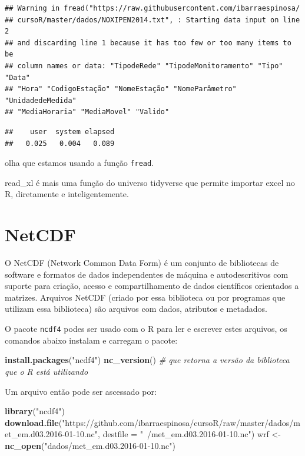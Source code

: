 \documentclass[]{book}
\newenvironment{Shaded}{\begin{snugshade}}{\end{snugshade}}
\newcommand{\KeywordTok}[1]{\textcolor[rgb]{0.13,0.29,0.53}{\textbf{#1}}}
\newcommand{\DataTypeTok}[1]{\textcolor[rgb]{0.13,0.29,0.53}{#1}}
\newcommand{\StringTok}[1]{\textcolor[rgb]{0.31,0.60,0.02}{#1}}
\newcommand{\CommentTok}[1]{\textcolor[rgb]{0.56,0.35,0.01}{\textit{#1}}}
\newcommand{\NormalTok}[1]{#1}
\theoremstyle{definition}
\theoremstyle{definition}
\theoremstyle{definition}
\theoremstyle{remark}
\begin{document}
\begin{verbatim}
## Warning in fread("https://raw.githubusercontent.com/ibarraespinosa/
## cursoR/master/dados/NOXIPEN2014.txt", : Starting data input on line 2
## and discarding line 1 because it has too few or too many items to be
## column names or data: "TipodeRede" "TipodeMonitoramento" "Tipo" "Data"
## "Hora" "CodigoEstação" "NomeEstação" "NomeParâmetro" "UnidadedeMedida"
## "MediaHoraria" "MediaMovel" "Valido"
\end{verbatim}

\begin{verbatim}
##    user  system elapsed 
##   0.025   0.004   0.089
\end{verbatim}

olha que estamos usando a função \texttt{fread}.

read\_xl é mais uma função do universo tidyverse que permite importar
excel no R, diretamente e inteligentemente.

\section{NetCDF}\label{netcdf}

O NetCDF (Network Common Data Form) é um conjunto de bibliotecas de
software e formatos de dados independentes de máquina e autodescritivos
com suporte para criação, acesso e compartilhamento de dados científicos
orientados a matrizes. Arquivos NetCDF (criado por essa biblioteca ou
por programas que utilizam essa biblioteca) são arquivos com dados,
atributos e metadados.

O pacote \texttt{ncdf4} podes ser usado com o R para ler e escrever
estes arquivos, os comandos abaixo instalam e carregam o pacote:

\begin{Shaded}
\begin{Highlighting}[]
\KeywordTok{install.packages}\NormalTok{(}\StringTok{"ncdf4"}\NormalTok{)}
\KeywordTok{nc_version}\NormalTok{() }\CommentTok{# que retorna a versão da biblioteca que o R está utilizando}
\end{Highlighting}
\end{Shaded}

Um arquivo então pode ser ascessado por:

\begin{Shaded}
\begin{Highlighting}[]
\KeywordTok{library}\NormalTok{(}\StringTok{"ncdf4"}\NormalTok{)}
\KeywordTok{download.file}\NormalTok{(}\StringTok{"https://github.com/ibarraespinosa/cursoR/raw/master/dados/met_em.d03.2016-01-10.nc"}\NormalTok{, }\DataTypeTok{destfile =} \StringTok{"~/met_em.d03.2016-01-10.nc"}\NormalTok{)}
\NormalTok{wrf <-}\StringTok{ }\KeywordTok{nc_open}\NormalTok{(}\StringTok{"dados/met_em.d03.2016-01-10.nc"}\NormalTok{)}
\end{Highlighting}
\end{Shaded}
\end{document}
